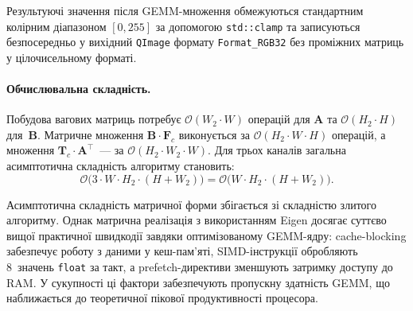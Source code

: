 Результуючі значення після GEMM-множення обмежуються стандартним
колірним діапазоном $[0, 255]$ за допомогою \texttt{std::clamp} та
записуються безпосередньо у вихідний \texttt{QImage} формату
\texttt{Format\_RGB32} без проміжних матриць у цілочисельному форматі.

\paragraph{Обчислювальна складність.}
Побудова вагових матриць потребує $\mathcal{O}(W_2 \cdot W)$ операцій
для $\mathbf{A}$ та $\mathcal{O}(H_2 \cdot H)$ для~$\mathbf{B}$.
Матричне множення $\mathbf{B} \cdot \mathbf{F}_c$ виконується за
$\mathcal{O}(H_2 \cdot W \cdot H)$ операцій, а множення
$\mathbf{T}_c \cdot \mathbf{A}^{\!\top}$~--- за
$\mathcal{O}(H_2 \cdot W_2 \cdot W)$. Для трьох каналів загальна
асимптотична складність алгоритму становить:
\begin{equation}
	\mathcal{O}\bigl(3 \cdot W \cdot H_2 \cdot (H + W_2)\bigr)
	= \mathcal{O}\bigl(W \cdot H_2 \cdot (H + W_2)\bigr).
\end{equation}

Асимптотична складність матричної форми збігається зі складністю злитого
алгоритму. Однак матрична реалізація з використанням Eigen досягає
суттєво вищої практичної швидкодії завдяки оптимізованому GEMM-ядру:
cache-blocking забезпечує роботу з даними у кеш-пам'яті, SIMD-інструкції
обробляють 8~значень \texttt{float} за такт, а prefetch-директиви
зменшують затримку доступу до RAM. У сукупності ці фактори
забезпечують пропускну здатність GEMM, що наближається до теоретичної
пікової продуктивності процесора.